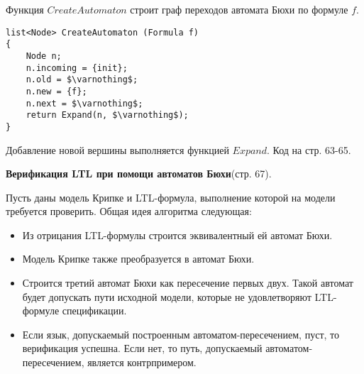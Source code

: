 \documentclass[a4paper,12pt]{article}
\begin{document}
Функция $CreateAutomaton$ строит граф переходов
автомата Бюхи по формуле $f$.
\begin{lstlisting}[mathescape]
list<Node> CreateAutomaton (Formula f)
{
    Node n;
    n.incoming = {init};
    n.old = $\varnothing$;
    n.new = {f};
    n.next = $\varnothing$;
    return Expand(n, $\varnothing$);
}
\end{lstlisting}
Добавление новой вершины выполняется функцией $Expand$.
Код на стр. 63-65.

\textbf{Верификация LTL при помощи автоматов Бюхи}(стр. 67).

Пусть даны модель Крипке и LTL-формула, выполнение которой на
модели требуется проверить. Общая идея алгоритма следующая:
\begin{itemize}
    \item Из отрицания LTL-формулы строится эквивалентный ей автомат
Бюхи.
    \item Модель Крипке также преобразуется в автомат Бюхи.
    \item Строится третий автомат Бюхи как пересечение первых двух.
Такой автомат будет допускать пути исходной модели, которые не
удовлетворяют LTL-формуле спецификации.
    \item Если язык, допускаемый построенным автоматом-пересечением,
пуст, то верификация успешна. Если нет, то путь, допускаемый
автоматом-пересечением, является контрпримером.
\end{itemize}
\end{document}
